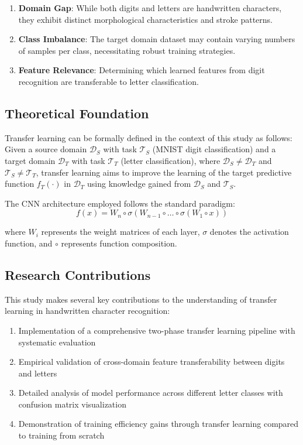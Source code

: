 \documentclass[12pt,a4paper]{article}
\begin{document}
\begin{enumerate}
    \item \textbf{Domain Gap}: While both digits and letters are handwritten characters, they exhibit distinct morphological characteristics and stroke patterns.
    \item \textbf{Class Imbalance}: The target domain dataset may contain varying numbers of samples per class, necessitating robust training strategies.
    \item \textbf{Feature Relevance}: Determining which learned features from digit recognition are transferable to letter classification.
\end{enumerate}

\subsection{Theoretical Foundation}

Transfer learning can be formally defined in the context of this study as follows: Given a source domain $\mathcal{D}_S$ with task $\mathcal{T}_S$ (MNIST digit classification) and a target domain $\mathcal{D}_T$ with task $\mathcal{T}_T$ (letter classification), where $\mathcal{D}_S \neq \mathcal{D}_T$ and $\mathcal{T}_S \neq \mathcal{T}_T$, transfer learning aims to improve the learning of the target predictive function $f_T(\cdot)$ in $\mathcal{D}_T$ using knowledge gained from $\mathcal{D}_S$ and $\mathcal{T}_S$.

The CNN architecture employed follows the standard paradigm:
\begin{equation}
f(x) = W_n \circ \sigma(W_{n-1} \circ \ldots \circ \sigma(W_1 \circ x))
\end{equation}

where $W_i$ represents the weight matrices of each layer, $\sigma$ denotes the activation function, and $\circ$ represents function composition.

\subsection{Research Contributions}

This study makes several key contributions to the understanding of transfer learning in handwritten character recognition:

\begin{enumerate}
    \item Implementation of a comprehensive two-phase transfer learning pipeline with systematic evaluation
    \item Empirical validation of cross-domain feature transferability between digits and letters
    \item Detailed analysis of model performance across different letter classes with confusion matrix visualization
    \item Demonstration of training efficiency gains through transfer learning compared to training from scratch
\end{enumerate}
\end{document}
